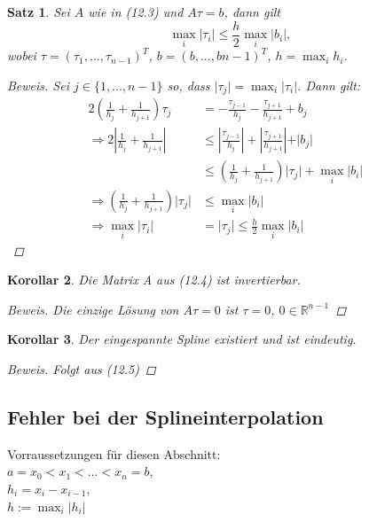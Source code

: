 \documentclass[12pt]{article}
\theoremstyle{break}
\newtheorem{theorem}{Satz}[subsection]
\newtheorem{korollar}[theorem]{Korollar}
\begin{document}
\begin{theorem}
Sei $A$ wie in (12.3) und $A\tau = b$, dann gilt
$$\max_i \vert \tau_i \vert \leq \frac{h}{2} \max_i \vert b_i \vert,$$
wobei $\tau = (\tau_1, ..., \tau_{n-1})^T$, $b = (b, ..., b{n-1})^T$, $h = \max_i h_i$.

\begin{proof}[Beweis]
Sei $j \in \{1, ..., n-1\}$ so, dass $\vert \tau_j \vert = \max_i \vert \tau_i \vert$. Dann gilt:
\begin{align*}
2 \left( \frac{1}{h_j} + \frac{1}{h_{j+1}} \right) \tau_j &= -\frac{\tau_{j-1}}{h_j} -\frac{\tau_{j+1}}{h_{j+1}} + b_j &\\
\Rightarrow 2 \left\vert \frac{1}{h_j} + \frac{1}{h_{j+1}} \right\vert & \leq \left\vert \frac{\tau_{j-1}}{h_j} \right\vert + \left\vert \frac{\tau_{j+1}}{h_{j+1}} \right\vert + \vert b_j \vert &\\
& \leq \left( \frac{1}{h_j} + \frac{1}{h_{j+1}} \right) \vert \tau_j \vert + \max_i \vert b_i \vert &\\
\Rightarrow \left( \frac{1}{h_j} + \frac{1}{h_{j+1}} \right) \vert \tau_j \vert &\leq \max_i \vert b_i \vert &\\
\Rightarrow \max_i \vert \tau_i \vert &= \vert \tau_j \vert \leq \frac{h}{2} \max_i \vert b_i \vert 
\end{align*}
\end{proof}
\end{theorem}

\begin{korollar}
Die Matrix A aus (12.4) ist invertierbar.
\begin{proof}[Beweis]
Die einzige Lösung von $A\tau = 0$ ist $\tau = 0$, $0 \in \mathbb{R}^{n-1}$
\end{proof}
\end{korollar}

\begin{korollar}
Der eingespannte Spline existiert und ist eindeutig.
\begin{proof}[Beweis]
Folgt aus (12.5)
\end{proof}
\end{korollar}

\subsection{Fehler bei der Splineinterpolation}
Vorraussetzungen für diesen Abschnitt: \\
$a = x_0 < x_1 < ... < x_n = b$, \\
$h_i= x_i-x_{i-1}$, \\
$h:= \max_i \vert h_i \vert$
\end{document}
